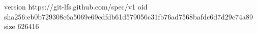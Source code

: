 version https://git-lfs.github.com/spec/v1
oid sha256:eb0b729308c6a5069e69cdfdb61d579056c31fb76ad7568bafdc6d7d29c74a89
size 626416
